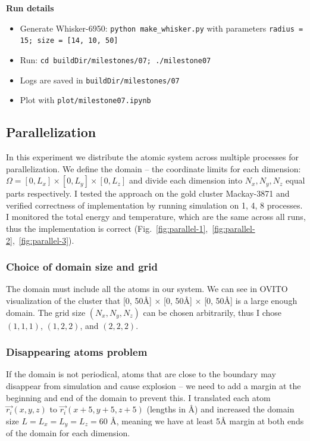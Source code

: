 \documentclass[12pt,a4paper]{article}
\newcommand{\mat}[1]{\vec{#1}}
\begin{document}
{\bf Run details}
\begin{itemize}
	\item Generate Whisker-6950: \verb|python make_whisker.py| with parameters \verb|radius = 15; size = [14, 10, 50]|
	\item Run: \verb|cd buildDir/milestones/07; ./milestone07|
	\item Logs are saved in \verb|buildDir/milestones/07|
	\item Plot with \verb|plot/milestone07.ipynb|
	
\end{itemize}

\newpage

\subsection*{Parallelization}

In this experiment we distribute the atomic system across multiple processes for parallelization. We define the domain -- the coordinate limits for each dimension: $\Omega = [0, L_x] \times [0, L_y] \times [0, L_z]$ and divide each dimension into $N_x, N_y, N_z$ equal parts respectively. I tested the approach on the gold cluster Mackay-3871 and verified correctness of implementation by running simulation on 1, 4, 8 processes. I monitored the total energy and temperature, which are the same across all runs, thus the implementation is correct (Fig.~\ref{fig:parallel-1},~\ref{fig:parallel-2},~\ref{fig:parallel-3}).

\subsubsection*{Choice of domain size and grid}

The domain must include all the atoms in our system. We can see in OVITO visualization of the cluster that [0, 50Å] $\times$ [0, 50Å] $\times$ [0, 50Å] is a large enough domain. The grid size $(N_x, N_y, N_z)$ can be chosen arbitrarily, thus I chose $(1, 1, 1)$, $(1, 2, 2)$, and $(2, 2, 2)$.

\subsubsection*{Disappearing atoms problem}

If the domain is not periodical, atoms that are close to the boundary may disappear from simulation and cause explosion -- we need to add a margin at the beginning and end of the domain to prevent this. I translated each atom $\mat{r_i}(x, y, z)$ to  $\mat{r_i}(x + 5, y + 5, z + 5)$ (lengths in Å) and increased the domain size $L = L_x = L_y = L_z = 60$ Å, meaning we have at least 5Å margin at both ends of the domain for each dimension.
\end{document}
